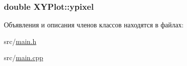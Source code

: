 \hypertarget{class_x_y_plot_a51fc0a1063b00947128c0b899f4bb9be}{
\subsubsection[{ypixel}]{\setlength{\rightskip}{0pt plus 5cm}double X\-Y\-Plot\-::ypixel\hspace{0.3cm}{\ttfamily [protected]}}}\label{class_x_y_plot_a51fc0a1063b00947128c0b899f4bb9be}


Объявления и описания членов классов находятся в файлах\-:\begin{DoxyCompactItemize}
\item 
src/\hyperlink{main_8h}{main.\-h}\item 
src/\hyperlink{main_8cpp}{main.\-cpp}\end{DoxyCompactItemize}
